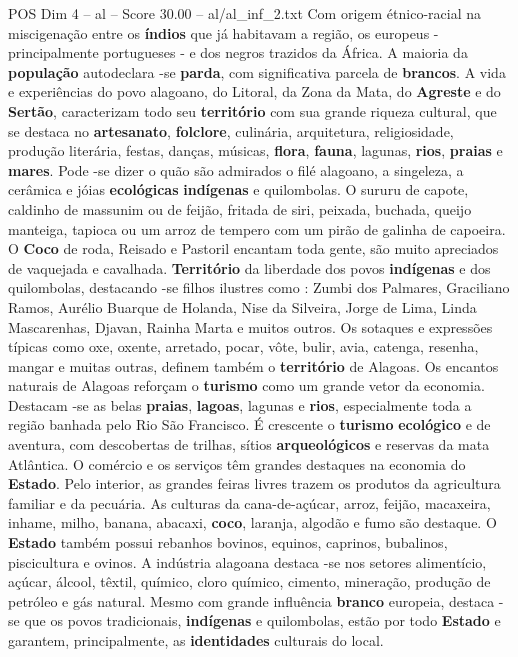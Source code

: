 \begin{textsample}{POS Dim 4 – al – Score 30.00 – al/al\_inf\_2.txt}
Com origem étnico-racial na miscigenação entre os \textbf{índios} que já habitavam a região, os europeus - principalmente portugueses - e dos negros trazidos da África.
A maioria da \textbf{população} autodeclara -se \textbf{parda}, com significativa parcela de \textbf{brancos}.
A vida e experiências do povo alagoano, do Litoral, da Zona da Mata, do \textbf{Agreste} e do \textbf{Sertão}, caracterizam todo seu \textbf{território} com sua grande riqueza cultural, que se destaca no \textbf{artesanato}, \textbf{folclore}, culinária, arquitetura, religiosidade, produção literária, festas, danças, músicas, \textbf{flora}, \textbf{fauna}, lagunas, \textbf{rios}, \textbf{praias} e \textbf{mares}.
Pode -se dizer o quão são admirados o filé alagoano, a singeleza, a cerâmica e jóias \textbf{ecológicas} \textbf{indígenas} e quilombolas.
O sururu de capote, caldinho de massunim ou de feijão, fritada de siri, peixada, buchada, queijo manteiga, tapioca ou um arroz de tempero com um pirão de galinha de capoeira.
O \textbf{Coco} de roda, Reisado e Pastoril encantam toda gente, são muito apreciados de vaquejada e cavalhada. \textbf{Território} da liberdade dos povos \textbf{indígenas} e dos quilombolas, destacando -se filhos ilustres como : Zumbi dos Palmares, Graciliano Ramos, Aurélio Buarque de Holanda, Nise da Silveira, Jorge de Lima, Linda Mascarenhas, Djavan, Rainha Marta e muitos outros.
Os sotaques e expressões típicas como oxe, oxente, arretado, pocar, vôte, bulir, avia, catenga, resenha, mangar e muitas outras, definem também o \textbf{território} de Alagoas.
Os encantos naturais de Alagoas reforçam o \textbf{turismo} como um grande vetor da economia.
Destacam -se as belas \textbf{praias}, \textbf{lagoas}, lagunas e \textbf{rios}, especialmente toda a região banhada pelo Rio São Francisco.
É crescente o \textbf{turismo} \textbf{ecológico} e de aventura, com descobertas de trilhas, sítios \textbf{arqueológicos} e reservas da mata Atlântica.
O comércio e os serviços têm grandes destaques na economia do \textbf{Estado}.
Pelo interior, as grandes feiras livres trazem os produtos da agricultura familiar e da pecuária.
As culturas da cana-de-açúcar, arroz, feijão, macaxeira, inhame, milho, banana, abacaxi, \textbf{coco}, laranja, algodão e fumo são destaque.
O \textbf{Estado} também possui rebanhos bovinos, equinos, caprinos, bubalinos, piscicultura e ovinos.
A indústria alagoana destaca -se nos setores alimentício, açúcar, álcool, têxtil, químico, cloro químico, cimento, mineração, produção de petróleo e gás natural.
Mesmo com grande influência \textbf{branco} europeia, destaca -se que os povos tradicionais, \textbf{indígenas} e quilombolas, estão por todo \textbf{Estado} e garantem, principalmente, as \textbf{identidades} culturais do local.

\end{textsample}
